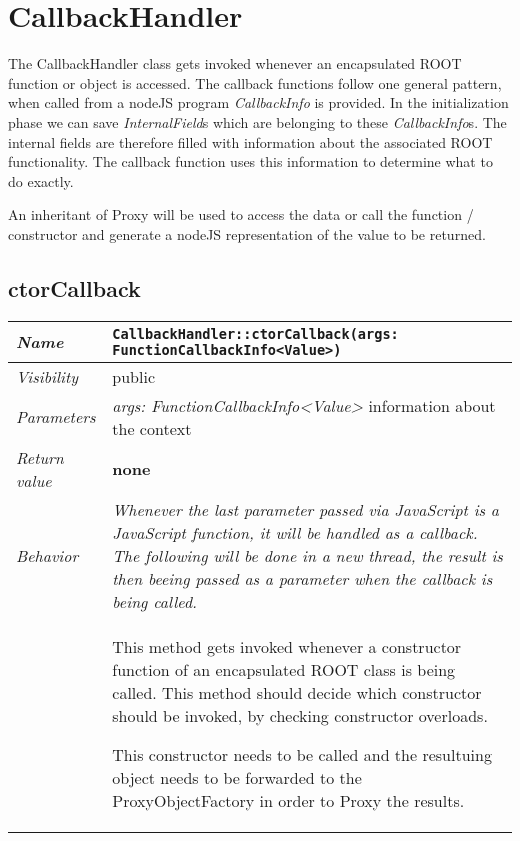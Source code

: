\chapter{CallbackHandler}
The CallbackHandler class gets invoked whenever an encapsulated ROOT function or object is accessed.
The callback functions follow one general pattern, when called from a nodeJS program \textit{CallbackInfo} is provided.
In the initialization phase we can save \textit{InternalField}s which are belonging to these \textit{CallbackInfo}s.
The internal fields are therefore filled with information about the associated ROOT functionality.
The callback function uses this information to determine what to do exactly.

An inheritant of Proxy will be used to access the data or call the function / constructor and generate a nodeJS representation of the value to be returned.
\section{ctorCallback}
\begin{longtable}{p{3cm} @{\hskip 1cm} p{12cm}}
 \hline
\textit{Name} & \texttt{CallbackHandler::ctorCallback(args: FunctionCallbackInfo<Value>)}\\
\hline
 \textit{Visibility} & public\\
\hline
\textit{Parameters} & \textit{args: FunctionCallbackInfo<Value>} information about the context\\
\hline
\textit{Return value} & \textbf{none}\\
  \hline
 \textit{Behavior} &
 \textit{Whenever the last parameter passed via JavaScript is a JavaScript function, it will be handled as a callback. The following will be done in a new thread, the result is then beeing passed as a parameter when the callback is being called.}\\

 & This method gets invoked whenever a constructor function of an encapsulated ROOT class is being called.
 This method should decide which constructor should be invoked, by checking constructor overloads.

 This constructor needs to be called and the resultuing object needs to be forwarded to the ProxyObjectFactory in order to Proxy the results.\\
\hline
\end{longtable}
